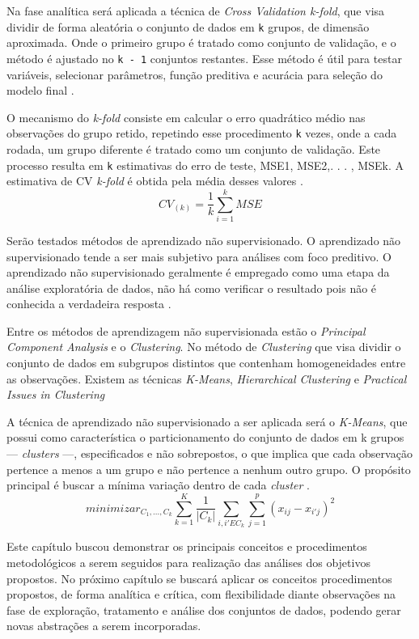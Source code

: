 \documentclass[12pt,12pt,openright,oneside,a4paper,chapter=TITLE,section=TITLE,subsection=TITLE,subsubsection=TITLE english,french,spanish,portugues,sumario=tradicional]{abntex2}
\begin{document}
Na fase analítica será aplicada a técnica de \emph{Cross Validation k-fold}, que visa dividir de forma aleatória o conjunto de dados em \texttt{k} grupos, de dimensão aproximada. Onde o primeiro grupo é tratado como conjunto de validação, e o método é ajustado no \texttt{k\ -\ 1} conjuntos restantes. Esse método é útil para testar variáveis, selecionar parâmetros, função preditiva e acurácia para seleção do modelo final \cite{gareth:2017}.

O mecanismo do \emph{k-fold} consiste em calcular o erro quadrático médio nas observações do grupo retido, repetindo esse procedimento \texttt{k} vezes, onde a cada rodada, um grupo diferente é tratado como um conjunto de validação. Este processo resulta em \texttt{k} estimativas do erro de teste, MSE1, MSE2,. . . , MSEk. A estimativa de CV \emph{k-fold} é obtida pela média desses valores \cite{gareth:2017}.
\[
CV_{(k)} = \frac{1}{k}\sum_{i=1}^{k}MSE  
\]

Serão testados métodos de aprendizado não supervisionado. O aprendizado não supervisionado tende a ser mais subjetivo para análises com foco preditivo. O aprendizado não supervisionado geralmente é empregado como uma etapa da análise exploratória de dados, não há como verificar o resultado pois não é conhecida a verdadeira resposta \cite{gareth:2017}.

Entre os métodos de aprendizagem não supervisionada estão o \emph{Principal Component Analysis} e o \emph{Clustering}. No método de \emph{Clustering} que visa dividir o conjunto de dados em subgrupos distintos que contenham homogeneidades entre as observações. Existem as técnicas \emph{K-Means}, \emph{Hierarchical Clustering} e \emph{Practical Issues in Clustering} \cite{gareth:2017}

A técnica de aprendizado não supervisionado a ser aplicada será o \emph{K-Means}, que possui como característica o particionamento do conjunto de dados em k grupos --- \emph{clusters} ---, especificados e não sobrepostos, o que implica que cada observação pertence a menos a um grupo e não pertence a nenhum outro grupo. O propósito principal é buscar a mínima variação dentro de cada \emph{cluster} \cite{gareth:2017}.
\[
minimizar_{C_1,...,C_k} \sum_{k = 1}^{K}\frac{1}{|C_k|}\sum_{i,i' E C_k} \sum_{j=1}^{p}(x_{ij} - x_{i'j})^2 
\]

Este capítulo buscou demonstrar os principais conceitos e procedimentos metodológicos a serem seguidos para realização das análises dos objetivos propostos. No próximo capítulo se buscará aplicar os conceitos procedimentos propostos, de forma analítica e crítica, com flexibilidade diante observações na fase de exploração, tratamento e análise dos conjuntos de dados, podendo gerar novas abstrações a serem incorporadas.
\end{document}
